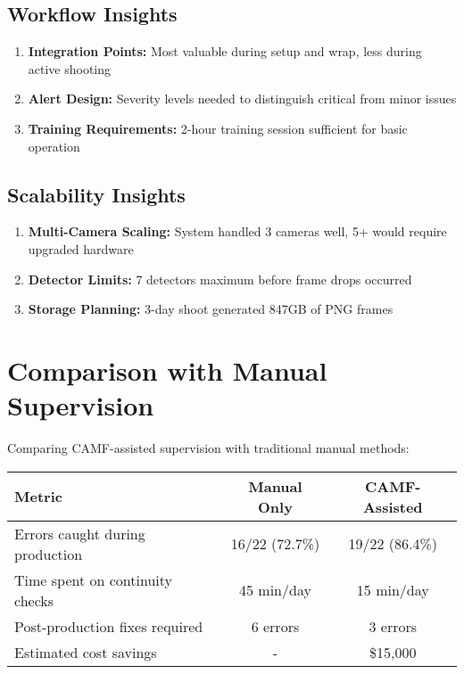 \subsection{Workflow Insights}
\label{subsec:workflow-insights}

\begin{enumerate}
\item \textbf{Integration Points:} Most valuable during setup and wrap, less during active shooting
\item \textbf{Alert Design:} Severity levels needed to distinguish critical from minor issues
\item \textbf{Training Requirements:} 2-hour training session sufficient for basic operation
\end{enumerate}

\subsection{Scalability Insights}
\label{subsec:scale-insights}

\begin{enumerate}
\item \textbf{Multi-Camera Scaling:} System handled 3 cameras well, 5+ would require upgraded hardware
\item \textbf{Detector Limits:} 7 detectors maximum before frame drops occurred
\item \textbf{Storage Planning:} 3-day shoot generated 847GB of PNG frames
\end{enumerate}

\section{Comparison with Manual Supervision}
\label{sec:comparison}

Comparing CAMF-assisted supervision with traditional manual methods:

\begin{center}
\begin{tabular}{|l|c|c|}
\hline
\textbf{Metric} & \textbf{Manual Only} & \textbf{CAMF-Assisted} \\
\hline
Errors caught during production & 16/22 (72.7\%) & 19/22 (86.4\%) \\
Time spent on continuity checks & 45 min/day & 15 min/day \\
Post-production fixes required & 6 errors & 3 errors \\
Estimated cost savings & - & \$15,000 \\
\hline
\end{tabular}
\end{center}

